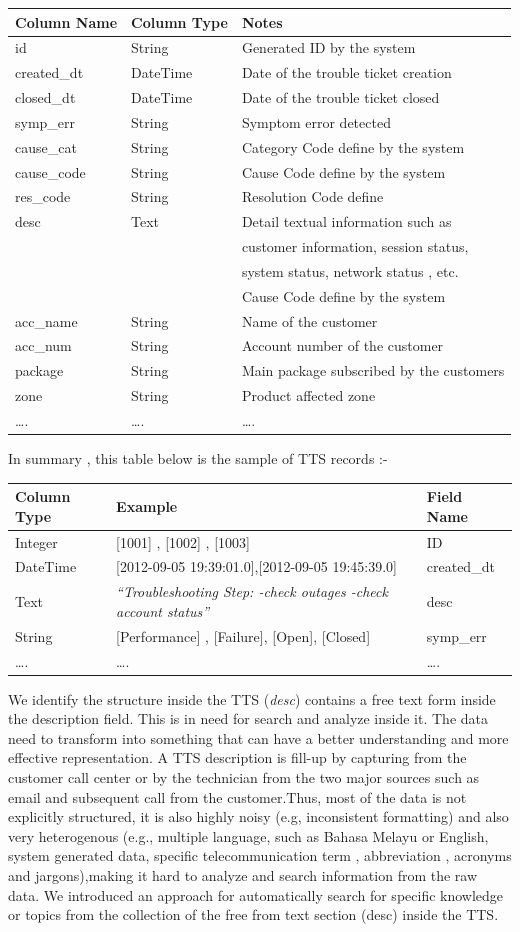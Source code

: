 \documentclass[]{article}
\begin{document}
\begin{longtable}[c]{@{}lll@{}}
\toprule
Column Name & Column Type & Notes\tabularnewline
\midrule
\endhead
id & String & Generated ID by the system\tabularnewline
created\_dt & DateTime & Date of the trouble ticket
creation\tabularnewline
closed\_dt & DateTime & Date of the trouble ticket closed\tabularnewline
symp\_err & String & Symptom error detected\tabularnewline
cause\_cat & String & Category Code define by the system\tabularnewline
cause\_code & String & Cause Code define by the system\tabularnewline
res\_code & String & Resolution Code define\tabularnewline
desc & Text & Detail textual information such as\tabularnewline
& & customer information, session status,\tabularnewline
& & system status, network status , etc.\tabularnewline
& & Cause Code define by the system\tabularnewline
acc\_name & String & Name of the customer\tabularnewline
acc\_num & String & Account number of the customer\tabularnewline
package & String & Main package subscribed by the
customers\tabularnewline
zone & String & Product affected zone\tabularnewline
\ldots{}. & \ldots{}. & \ldots{}.\tabularnewline
\bottomrule
\end{longtable}

In summary , this table below is the sample of TTS records :-

\begin{longtable}[c]{@{}lll@{}}
\toprule
Column Type & Example & Field Name\tabularnewline
\midrule
\endhead
Integer & {[}1001{]} , {[}1002{]} , {[}1003{]} & ID\tabularnewline
DateTime & {[}2012-09-05 19:39:01.0{]},{[}2012-09-05 19:45:39.0{]} &
created\_dt\tabularnewline
Text & \emph{``Troubleshooting Step: -check outages -check account
status''} & desc\tabularnewline
String & {[}Performance{]} , {[}Failure{]}, {[}Open{]}, {[}Closed{]} &
symp\_err\tabularnewline
\ldots{}. & \ldots{}. & \ldots{}.\tabularnewline
\bottomrule
\end{longtable}

We identify the structure inside the TTS (\emph{desc}) contains a free
text form inside the description field. This is in need for search and
analyze inside it. The data need to transform into something that can
have a better understanding and more effective representation. A TTS
description is fill-up by capturing from the customer call center or by
the technician from the two major sources such as email and subsequent
call from the customer.Thus, most of the data is not explicitly
structured, it is also highly noisy (e.g, inconsistent formatting) and
also very heterogenous (e.g., multiple language, such as Bahasa Melayu
or English, system generated data, specific telecommunication term ,
abbreviation , acronyms and jargons),making it hard to analyze and
search information from the raw data. We introduced an approach for
automatically search for specific knowledge or topics from the
collection of the free from text section (desc) inside the TTS.
\end{document}
